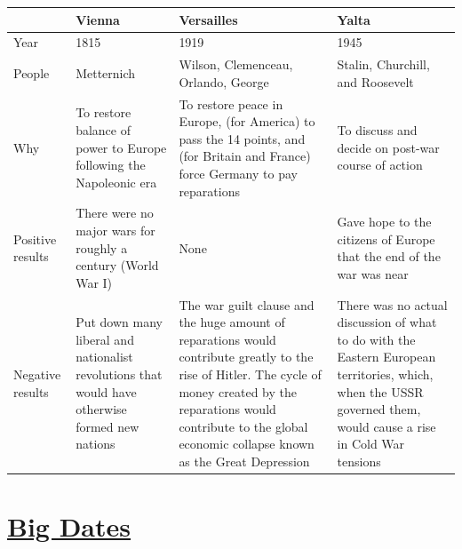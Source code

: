 \documentclass[12pt]{article}
\begin{document}
\begin{enumerate}
\begin{tabular}{|p{}|p{}|p{}|p{}|}
\hline
& Vienna & Versailles & Yalta \\
\hline
Year & 1815 & 1919 & 1945 \\
\hline
People & Metternich & Wilson, Clemenceau, Orlando, George & Stalin, Churchill, and Roosevelt \\
\hline
Why & To restore balance of power to Europe following the Napoleonic era & To restore peace in Europe, (for America) to pass the 14 points, and (for Britain and France) force Germany to pay reparations & To discuss and decide on post-war course of action\\
\hline
Positive results & There were no major wars for roughly a century (World War I) & None  & Gave hope to the citizens of Europe that the end of the war was near \\
\hline
Negative results & Put down many liberal and nationalist revolutions that would have otherwise formed new nations & The war guilt clause and the huge amount of reparations would contribute greatly to the rise of Hitler. The cycle of money created by the reparations would contribute to the global economic collapse known as the Great Depression & There was no actual discussion of what to do with the Eastern European territories, which, when the USSR governed them, would cause a rise in Cold War tensions  \\
\hline
\end{tabular}
\section{\underline{Big Dates}}



\end{enumerate}
\end{document}
